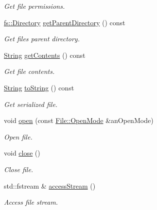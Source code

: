\begin{DoxyCompactItemize}
\begin{DoxyCompactList}\small\item\em Get file permissions. \end{DoxyCompactList}\item 
\hyperlink{classlibrary_1_1core_1_1fs_1_1_directory}{fs\+::\+Directory} \hyperlink{classlibrary_1_1core_1_1fs_1_1_file_a8eb74097f9bdc9d3c626fe4924bf405e}{get\+Parent\+Directory} () const
\begin{DoxyCompactList}\small\item\em Get file\textquotesingle{}s parent directory. \end{DoxyCompactList}\item 
\hyperlink{classlibrary_1_1core_1_1types_1_1_string}{String} \hyperlink{classlibrary_1_1core_1_1fs_1_1_file_a0a48a4d886d255e53e35511f1519e7fa}{get\+Contents} () const
\begin{DoxyCompactList}\small\item\em Get file contents. \end{DoxyCompactList}\item 
\hyperlink{classlibrary_1_1core_1_1types_1_1_string}{String} \hyperlink{classlibrary_1_1core_1_1fs_1_1_file_a891360e0ec67f357b528b3a1827d8c21}{to\+String} () const
\begin{DoxyCompactList}\small\item\em Get serialized file. \end{DoxyCompactList}\item 
void \hyperlink{classlibrary_1_1core_1_1fs_1_1_file_ad02420dc1c5238f384ca1e5a75b13ee9}{open} (const \hyperlink{classlibrary_1_1core_1_1fs_1_1_file_ac18b7d7ee50c803cbd0087b0f71ce4f7}{File\+::\+Open\+Mode} \&an\+Open\+Mode)
\begin{DoxyCompactList}\small\item\em Open file. \end{DoxyCompactList}\item 
void \hyperlink{classlibrary_1_1core_1_1fs_1_1_file_adf4fc7f78493f2ae10e228519ce46cf4}{close} ()
\begin{DoxyCompactList}\small\item\em Close file. \end{DoxyCompactList}\item 
std\+::fstream \& \hyperlink{classlibrary_1_1core_1_1fs_1_1_file_a2d6b8d823c82ebc60fefc459e2b7aa33}{access\+Stream} ()
\begin{DoxyCompactList}\small\item\em Access file stream. \end{DoxyCompactList}\item 

\end{DoxyCompactItemize}
